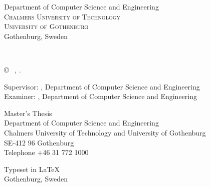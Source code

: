 {\begin{center}
	Department of Computer Science and Engineering\\
	\textsc{Chalmers University of Technology} \\
	\textsc{University of Gothenburg} \\
	Gothenburg, Sweden \the\year \\
\end{center}


\newpage
\thispagestyle{plain}
\vspace*{4.5cm}
\multiLineTitle{0.1cm}\\
\thesisAuthors \setlength{\parskip}{1cm}

\copyright ~ \thesisAuthors, \the\year. \setlength{\parskip}{1cm}

Supervisor: \thesisSupervisor, Department of Computer Science and Engineering\\
Examiner: \thesisExaminer, Department of Computer Science and Engineering \setlength{\parskip}{1cm}

Master's Thesis \the\year\\	%
Department of Computer Science and Engineering\\
Chalmers University of Technology and University of Gothenburg\\
SE-412 96 Gothenburg\\
Telephone +46 31 772 1000 \setlength{\parskip}{0.5cm}

\vfill
Typeset in \LaTeX \\
Gothenburg, Sweden \the\year

}
